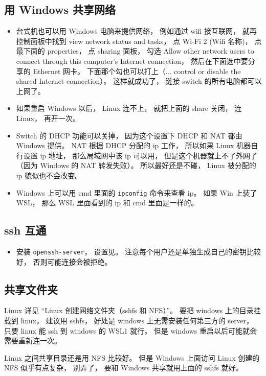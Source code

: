\subsection{用 Windows 共享网络}
\begin{itemize}
\item 台式机也可以用 Windows 电脑来提供网络， 例如通过 wifi 接互联网， 就再控制面板中找到 view network status and tasks， 点 Wi-Fi 2 (Wifi 名称)， 点最下面的 properties， 点 sharing 面板， 勾选 Allow other network users to connect through this computer's Internet connection， 然后在下面选中要分享的 Ethernet 网卡。 下面那个勾也可以打上（... control or disable the shared Internet connection）。 这样就成功了， 链接 switch 的所有电脑都可以上网了。
\item 如果重启 Windows 以后， Linux 连不上， 就把上面的 share 关闭， 连 Linux， 再开一次。
\item Switch 的 DHCP 功能可以关掉， 因为这个设置下 DHCP 和 NAT 都由 Windows 提供。 NAT 根据 DHCP 分配的 ip 工作， 所以如果 Linux 机器自行设置 ip 地址， 那么局域网中该 ip 可以用， 但是这个机器就上不了外网了（因为 Windows 的 NAT 转发失败）。 所以最好还是不碰， Linux 被分配的 ip 貌似也不会改变。
\item Windows 上可以用 cmd 里面的 \verb|ipconfig| 命令来查看 ip。 如果 Win 上装了 WSL， 那么 WSL 里面看到的 ip 和 cmd 里面是一样的。
\end{itemize}

\subsection{ssh 互通}
\begin{itemize}
\item 安装 \verb|openssh-server|， 设置见。 注意每个用户还是单独生成自己的密钥比较好， 否则可能连接会被拒绝。
\end{itemize}

\subsection{共享文件夹}
Linux 详见 “Linux 创建网络文件夹（sshfs 和 NFS）”。 要把 windows 上的目录挂载到 linux， 建议用 sshfs， 好处是 windows 上无需安装任何第三方的 server， 只要 linux 能 ssh 到 windows 的 WSL1 就行。 但是 windows 重启以后可能就会需要重新连一次。

Linux 之间共享目录还是用 NFS 比较好。 但是 Windows 上面访问 Linux 创建的 NFS 似乎有点复杂， 别弄了， 要和 Windows 共享就用上面的 sshfs 就好。

